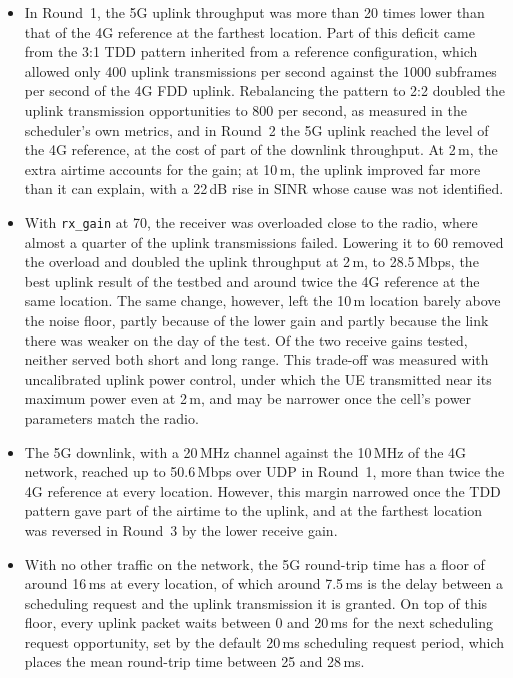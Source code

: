 \begin{itemize}
    \item In Round~1, the 5G uplink throughput was more than 20 times lower than that of the 4G reference at the farthest location. Part of this deficit came from the 3:1 \gls{TDD} pattern inherited from a reference configuration, which allowed only 400 uplink transmissions per second against the 1000 subframes per second of the 4G \gls{FDD} uplink. Rebalancing the pattern to 2:2 doubled the uplink transmission opportunities to 800 per second, as measured in the scheduler's own metrics, and in Round~2 the 5G uplink reached the level of the 4G reference, at the cost of part of the downlink throughput. At 2\,m, the extra airtime accounts for the gain; at 10\,m, the uplink improved far more than it can explain, with a 22\,dB rise in \gls{SINR} whose cause was not identified.

    \item With \texttt{rx\_gain} at 70, the receiver was overloaded close to the radio, where almost a quarter of the uplink transmissions failed. Lowering it to 60 removed the overload and doubled the uplink throughput at 2\,m, to 28.5\,Mbps, the best uplink result of the testbed and around twice the 4G reference at the same location. The same change, however, left the 10\,m location barely above the noise floor, partly because of the lower gain and partly because the link there was weaker on the day of the test. Of the two receive gains tested, neither served both short and long range. This trade-off was measured with uncalibrated uplink power control, under which the \gls{UE} transmitted near its maximum power even at 2\,m, and may be narrower once the cell's power parameters match the radio.

    \item The 5G downlink, with a 20\,MHz channel against the 10\,MHz of the 4G network, reached up to 50.6\,Mbps over UDP in Round~1, more than twice the 4G reference at every location. However, this margin narrowed once the \gls{TDD} pattern gave part of the airtime to the uplink, and at the farthest location was reversed in Round~3 by the lower receive gain.

    \item With no other traffic on the network, the 5G round-trip time has a floor of around 16\,ms at every location, of which around 7.5\,ms is the delay between a scheduling request and the uplink transmission it is granted. On top of this floor, every uplink packet waits between 0 and 20\,ms for the next scheduling request opportunity, set by the default 20\,ms scheduling request period, which places the mean round-trip time between 25 and 28\,ms.


\end{itemize}
